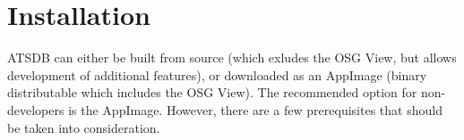 \chapter{Installation}
\label{sec:installation}

ATSDB can either be built from source (which exludes the OSG View, but allows development of additional features), or downloaded as an AppImage (binary distributable which includes the OSG View). The recommended option for non-developers is the AppImage. However, there are a few prerequisites that should be taken into consideration.








